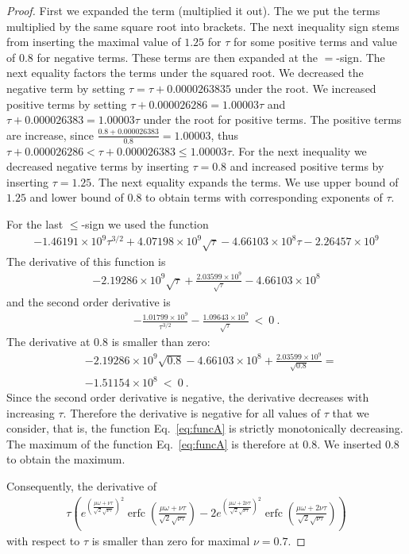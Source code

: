 \documentclass{article}
\renewcommand{\leq}{\leqslant}
\DeclareMathOperator{\erfc}{erfc}
\begin{document}
\begin{proof}
First we expanded the term (multiplied it out).
The we put the terms multiplied by the same square root into brackets.
The next inequality sign stems from inserting the maximal value of $1.25$ for $\tau$ for
some positive terms and value of $0.8$ for negative terms. 
These terms are then expanded at the $=$-sign.
The next equality factors the terms under the squared root.
We decreased the negative term by setting
$\tau=\tau+0.0000263835$ under the root.
We increased positive terms by setting  
$\tau+0.000026286=1.00003\tau$ and
$\tau+0.000026383 = 1.00003\tau$
under the root for positive terms.
The positive terms are increase, since
$\frac{0.8 + 0.000026383}{0.8}=1.00003$, thus
$\tau+0.000026286<\tau+0.000026383 \leq
1.00003\tau$.
For the next inequality we decreased negative terms by inserting
$\tau=0.8$ and increased positive terms by inserting
$\tau=1.25$. The next equality expands the terms.
We use upper bound of $1.25$ and lower bound of $0.8$ to obtain terms with
corresponding exponents of $\tau$.

For the last $\leq$-sign we used the function
\begin{align}
\label{eq:funcA}
-1.46191\times 10^9 \tau^{3/2}+4.07198\times 10^9
  \sqrt{\tau}-4.66103\times 10^8 \tau-2.26457\times 10^9
\end{align}
The derivative of this function is
\begin{align}
-2.19286\times 10^9 \sqrt{\tau}+\frac{2.03599\times
  10^9}{\sqrt{\tau}}-4.66103\times 10^8
\end{align}
and the second order derivative is
\begin{align}
-\frac{1.01799\times 10^9}{\tau^{3/2}}-\frac{1.09643\times
  10^9}{\sqrt{\tau}} \ < \ 0 \ .
\end{align}
The derivative at 0.8 is smaller than zero:
\begin{align}
&-2.19286\times 10^9 \sqrt{0.8}-4.66103\times 10^8+\frac{2.03599\times
  10^9}{\sqrt{0.8}}
= \\ \nonumber 
& -1.51154\times 10^8 \ < \ 0 \ .
\end{align}
Since the second order derivative is negative, the derivative
decreases with increasing $\tau$. Therefore the derivative is
negative for all values of  $\tau$ that we consider, that is, the
function Eq.~\eqref{eq:funcA} is strictly monotonically decreasing.
The maximum of the function Eq.~\eqref{eq:funcA} is therefore at $0.8$.
We inserted $0.8$ to obtain the maximum.



Consequently, the derivative of
\begin{align}
\label{eq:subx1}
\tau \left(e^{\left(\frac{\mu \omega+\nu \tau}{\sqrt{2} \sqrt{\nu \tau}}\right)^2} \erfc \left(\frac{\mu \omega+\nu \tau}{\sqrt{2} \sqrt{\nu \tau}}\right)-2 e^{\left(\frac{\mu \omega+2  \nu \tau}{\sqrt{2} \sqrt{\nu \tau}}\right)^2} \erfc \left(\frac{\mu \omega+2  \nu \tau}{\sqrt{2} \sqrt{\nu \tau}}\right)\right)
\end{align}
with respect to $\tau$ is smaller than zero for maximal $\nu = 0.7$.


\end{proof}
\end{document}
